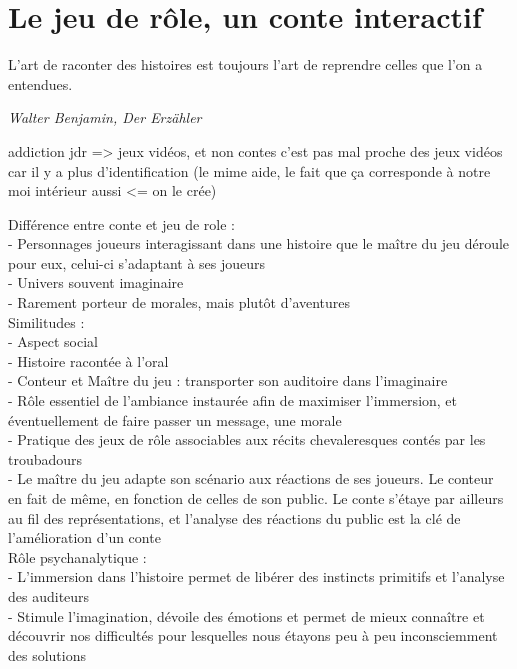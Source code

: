 \section{Le jeu de rôle, un conte interactif}

\begin{shadequote}
L'art de raconter des histoires est toujours l'art de reprendre celles que l'on a entendues. \par\emph{Walter Benjamin, Der Erzähler}
\end{shadequote}



addiction jdr => jeux vidéos, et non contes
c'est pas mal proche des jeux vidéos car il y a plus d'identification (le mime aide, le fait que ça corresponde à notre moi intérieur aussi <= on le crée)

Différence entre conte et jeu de role : \\
- Personnages joueurs interagissant dans une histoire que le maître du jeu déroule pour eux, celui-ci s'adaptant à ses joueurs\\
- Univers souvent imaginaire\\
- Rarement porteur de morales, mais plutôt d'aventures\\


Similitudes :\\
- Aspect social\\
- Histoire racontée à l'oral\\
- Conteur et Maître du jeu : transporter son auditoire dans l'imaginaire\\
- Rôle essentiel de l'ambiance instaurée afin de maximiser l'immersion, et éventuellement de faire passer un message, une morale\\
- Pratique des jeux de rôle associables aux récits chevaleresques contés par les troubadours\\
- Le maître du jeu adapte son scénario aux réactions de ses joueurs. Le conteur en fait de même, en fonction de celles de son public. Le conte s'étaye par ailleurs au fil des représentations, et l'analyse des réactions du public est la clé de l'amélioration d'un conte\\

Rôle psychanalytique :\\
- L'immersion dans l'histoire permet de libérer des instincts primitifs et l'analyse des auditeurs\\
- Stimule l'imagination, dévoile des émotions et permet de mieux connaître et découvrir nos difficultés pour lesquelles nous étayons peu à peu inconsciemment des solutions\\

\clearpage
